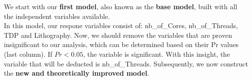 We start with our \textbf{first model}, also known as the \textbf{base model}, built with all the independent variables available. \\






In this model, our respone variables consist of: nb\_of\_Cores, nb\_of\_Threads, TDP and Lithography. Now, we should remove the variables that are proven insignificant to our analysis, which can be determined based on their Pr values (last column). If $Pr < 0.05$, the variable is significant. With this insight, the variable that will be deducted is nb\_of\_Threads. Subsequently, we now construct the \textbf{new and theoretically improved model}. \\





